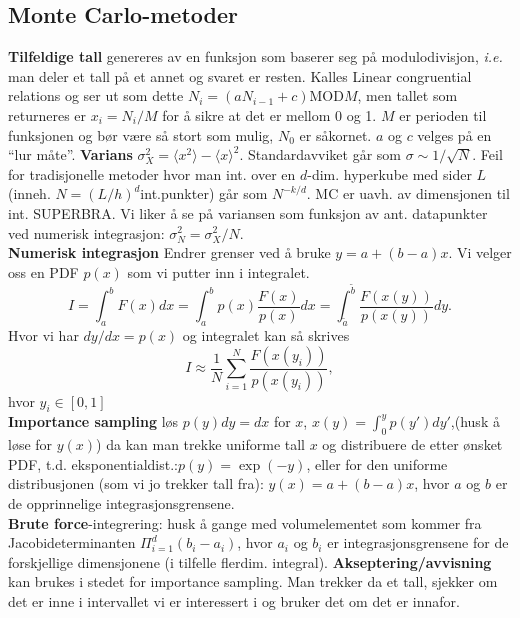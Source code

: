 \documentclass[12pt,a4paper,twocolumn]{article}
\begin{document}
\begin{flushleft}
\subsection{Monte Carlo-metoder} %
\label{sub:monte_carlo_metoder}
\textbf{Tilfeldige tall} genereres av en funksjon som baserer seg på modulodivisjon, \emph{i.e.} man deler et tall på et annet og svaret er resten. Kalles Linear congruential relations og ser ut som dette $N_i=(aN_{i-1}+c)$MOD$M$, men tallet som returneres er $x_i = N_i/M$ for å sikre at det er mellom 0 og 1. $M$ er perioden til funksjonen og bør være så stort som mulig, $N_0$ er såkornet. $a$ og $c$ velges på en ``lur måte''.
\textbf{Varians} $\sigma^2_X =  \langle x^2 \rangle - \langle x\rangle^2$. Standardavviket går som $\sigma \sim 1/\sqrt N$. Feil for tradisjonelle metoder hvor man int. over en $d$-dim. hyperkube med sider $L$ (inneh. $N = (L/h)^d$int.punkter) går som $N^{-k/d}$. MC er uavh. av dimensjonen til int. SUPERBRA. Vi liker å se på variansen som funksjon av ant. datapunkter ved numerisk integrasjon: $\sigma_N^2 = \sigma_X^2/N$.\\
\textbf{Numerisk integrasjon} Endrer grenser ved å bruke $y=a+(b-a)x$. Vi velger oss en PDF $p(x)$ som vi putter inn i integralet.
$$I=\int_a^b F(x) dx =\int_a^b p(x)\frac{F(x)}{p(x)} dx=\int_{\tilde{a}}^{\tilde{b}}\frac{F(x(y))}{p(x(y))} dy.$$
Hvor vi har $dy/dx=p(x)$ og integralet  kan så skrives
$$ I\approx  \frac{1}{N}\sum_{i=1}^N\frac{F(x(y_i))}{p(x(y_i))},$$
hvor $y_i\in[0,1]$\\
\textbf{Importance sampling} løs $p(y)dy=dx$ for $x$, $x(y) = \int_0^y p(y')dy'$,(husk å løse for $y(x)$) da kan man trekke uniforme tall $x$ og distribuere de etter ønsket PDF, t.d. eksponentialdist.:$p(y)=\exp(-y)$, eller for den uniforme distribusjonen (som vi jo trekker tall fra): $y(x) = a+(b-a)x$, hvor $a$ og $b$ er de opprinnelige integrasjonsgrensene.\\
\textbf{Brute force}-integrering: husk å gange med volumelementet som kommer fra Jacobideterminanten $\Pi_{i=1}^d(b_i-a_i)$, hvor $a_i$ og $b_i$ er integrasjonsgrensene for de forskjellige dimensjonene (i tilfelle flerdim. integral).
\textbf{Akseptering/avvisning} kan brukes i stedet for importance sampling. Man trekker da et tall, sjekker om det er inne i intervallet vi er interessert i og bruker det om det er innafor.


\end{flushleft}
\end{document}
